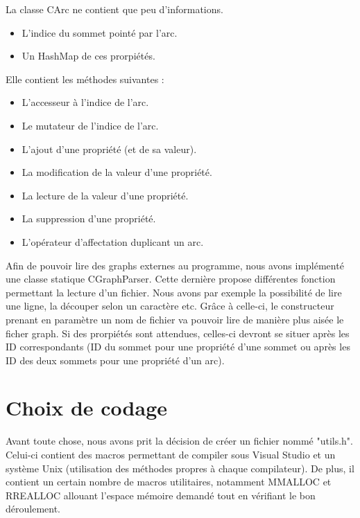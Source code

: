 		La classe CArc ne contient que peu d'informations.
		\begin{itemize}
			\item L'indice du sommet pointé par l'arc.
			\item Un HashMap de ces prorpiétés.\\
		\end{itemize}
		Elle contient les méthodes suivantes :
		\begin{itemize}
			\item L'accesseur à l'indice de l'arc.
			\item Le mutateur de l'indice de l'arc.
			\item L'ajout d'une propriété (et de sa valeur).
			\item La modification de la valeur d'une propriété.
			\item La lecture de la valeur d'une propriété.
			\item La suppression d'une propriété.
			\item L'opérateur d'affectation duplicant un arc.\\
		\end{itemize}
		
		Afin de pouvoir lire des graphs externes au programme, nous avons implémenté une classe statique CGraphParser. Cette dernière propose différentes fonction permettant la lecture d'un fichier. Nous avons par exemple la possibilité de lire une ligne, la découper selon un caractère etc. Grâce à celle-ci, le constructeur prenant en paramètre un nom de fichier va pouvoir lire de manière plus aisée le ficher graph. Si des prorpiétés sont attendues, celles-ci devront se situer après les ID correspondants (ID du sommet pour une propriété d'une sommet ou après les ID des deux sommets pour une propriété d'un arc).
		
		
		
	\chapter{Choix de codage}
		Avant toute chose, nous avons prit la décision de créer un fichier nommé "utils.h". Celui-ci contient des macros permettant de compiler sous Visual Studio et un système Unix (utilisation des méthodes propres à chaque compilateur). De plus, il contient un certain nombre de macros utilitaires, notamment MMALLOC et RREALLOC allouant l'espace mémoire demandé tout en vérifiant le bon déroulement.\\
	
